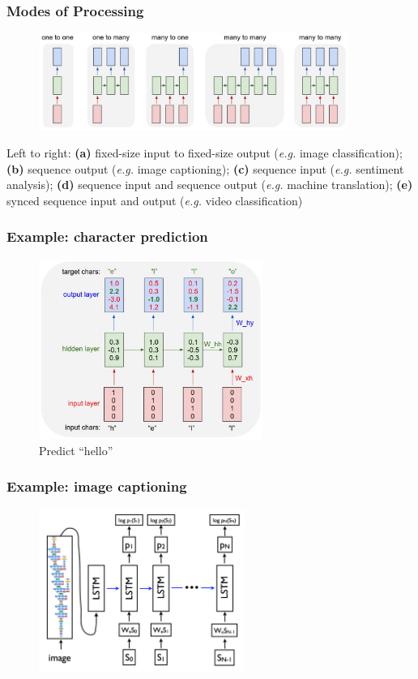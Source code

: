 \documentclass{beamer}
\begin{document}
\begin{frame}
  \frametitle{Modes of Processing}

  \begin{figure}
    \centering
    \includegraphics[width=0.9\textwidth]{diags.jpeg}
  \end{figure}

  Left to right: \textbf{(a)} fixed-size input to fixed-size output (\emph{e.g.} image classification); \textbf{(b)} sequence output (\emph{e.g.} image captioning); \textbf{(c)} sequence input (\emph{e.g.} sentiment analysis); \textbf{(d)} sequence input and sequence output (\emph{e.g.} machine translation); \textbf{(e)} synced sequence input and output (\emph{e.g.} video classification)
\end{frame}

\begin{frame}
  \frametitle{Example: character prediction}

  \begin{figure}
    \centering
    \includegraphics[width=0.65\textwidth]{charseq.jpeg}
    \caption{Predict ``hello''}
  \end{figure}
\end{frame}

\begin{frame}
  \frametitle{Example: image captioning}

  \begin{figure}
    \centering
    \includegraphics[width=0.6\textwidth]{image_captioning.png}
  \end{figure}
\end{frame}
\end{document}
